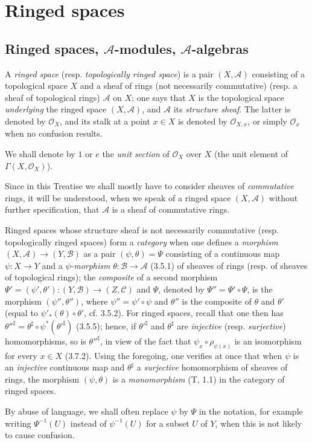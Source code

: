 \section{Ringed spaces}
\label{section:0.4}

\subsection{Ringed spaces, $\mathcal{A}$-modules, $\mathcal{A}$-algebras}
\label{subsection:0.4.1}

\begin{env}[4.1.1]
\label{0.4.1.1}
A \emph{ringed space} (resp. \emph{topologically ringed space}) is a pair
$(X,\mathcal{A})$ consisting of a topological space $X$ and a sheaf of rings
(not necessarily commutative) (resp. a sheaf of topological rings)
$\mathcal{A}$ on $X$; one says that $X$ is the
topological space \emph{underlying} the ringed space $(X,\mathcal{A})$, and
$\mathcal{A}$ its \emph{structure sheaf}. The latter is denoted by
$\mathcal{O}_X$, and its stalk at a point $x\in X$ is denoted by $\mathcal{O}_{X,x}$,
or simply $\mathcal{O}_x$ when no confusion results.

We shall denote by $1$ or $e$ the \emph{unit section} of $\mathcal{O}_X$
over $X$ (the unit element of $\Gamma(X,\mathcal{O}_X)$).

Since in this Treatise we shall mostly have to consider sheaves of
\emph{commutative} rings, it will be understood, when we speak of a ringed
space $(X,\mathcal{A})$ without further specification, that $\mathcal{A}$ is a sheaf
of commutative rings.

Ringed spaces whose structure sheaf is not necessarily commutative
(resp. topologically ringed spaces) form a \emph{category}
when one defines a \emph{morphism}
$(X,\mathcal{A})\to(Y,\mathcal{B})$ as a pair
$(\psi,\theta)=\Psi$ consisting of a continuous map $\psi:X\to Y$ and a
$\psi$-\emph{morphism} $\theta:\mathcal{B}\to\mathcal{A}$ (3.5.1) of
sheaves of rings (resp. of sheaves of topological rings); the
\emph{composite} of a second morphism
$\Psi'=(\psi',\theta'):(Y,\mathcal{B})\to(Z,\mathcal{C})$ and $\Psi$, denoted by
$\Psi''=\Psi'\circ\Psi$, is the morphism $(\psi'',\theta'')$, where
$\psi''=\psi'\circ\psi$ and $\theta''$ is the composite of $\theta$ and $\theta'$
(equal to $\psi'_*(\theta)\circ\theta'$, cf. 3.5.2). For ringed
spaces, recall that one then has
$\theta''^\sharp=\theta^\sharp\circ\psi^*(\theta'^\sharp)$ (3.5.5); hence, if
$\theta'^\sharp$ and $\theta^\sharp$ are \emph{injective}
(resp. \emph{surjective}) homomorphisms, so is $\theta''^\sharp$, in view
of the fact that $\psi_x\circ\rho_{\psi(x)}$ is an isomorphism for every $x\in X$
(3.7.2). Using the foregoing, one verifies at once that when $\psi$
is an \emph{injective} continuous map and $\theta^\sharp$ a
\emph{surjective} homomorphism of sheaves of rings, the morphism
$(\psi,\theta)$ is a \emph{monomorphism} (T, 1.1) in the category of
ringed spaces.

By abuse of language, we shall often replace $\psi$ by $\Psi$ in the
notation, for example writing $\Psi^{-1}(U)$ instead of $\psi^{-1}(U)$
for a subset $U$ of $Y$, when this is not likely to cause confusion.
\end{env}


